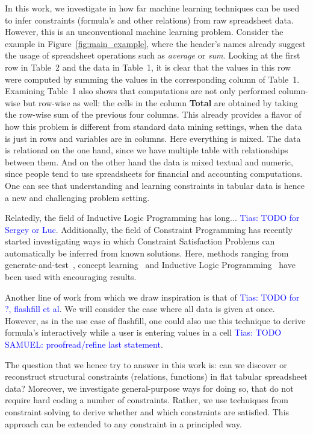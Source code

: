 \documentclass{ecai}
\newcommand{\tias}[1]{\textcolor{blue}{{\sc Tias:} #1}\xspace}
\begin{document}
In this work, we investigate in how far machine learning techniques can be used to infer constraints (formula's and other relations) from raw spreadsheet data. However, this is an unconventional machine learning problem. 
Consider the example in Figure~\ref{fig:main_example}, where the header's names already suggest the usage of spreadsheet operations such as \textit{average} or \textit{sum}.
Looking at the first row in Table~2 and the data in Table~1, it is clear that the values in this row were computed by summing the values in the corresponding column of Table~1.
Examining Table~1 also shows that computations are not only performed column-wise but row-wise as well: the cells in the column \textbf{Total} are obtained by taking the row-wise sum of the previous four columns.
This already provides a flavor of how this problem is different from standard data mining settings, when the data is just in rows and variables are in columns. Here everything is mixed. The data is relational on the one hand, since we have multiple table with relationships between them. And on the other hand the data is mixed textual and numeric, since people tend to use spreadsheets for financial and accounting computations. One can see that understanding and learning constraints in tabular data is hence a new and challenging problem setting.

Relatedly, the field of Inductive Logic Programming has long... \tias{TODO for Sergey or Luc}. Additionally, the field of Constraint Programming has recently started investigating ways in which Constraint Satisfaction Problems can automatically be inferred from known solutions. Here, methods ranging from generate-and-test~\cite{todo:modelseeker}, concept learning~\cite{todo:conacq} and Inductive Logic Programming~\cite{todo:lallouet} have been used with encouraging results.

Another line of work from which we draw inspiration is that of \tias{TODO for ?, flashfill et al}. We will consider the case where all data is given at once. However, as in the use case of flashfill, one could also use this technique to derive formula's interactively while a user is entering values in a cell \tias{TODO SAMUEL: proofread/refine last statement}.

The question that we hence try to answer in this work is: can we discover or reconstruct structural constraints (relations, functions) in flat tabular spreadsheet data? Moreover, we investigate general-purpose ways for doing so, that do not require hard coding a number of constraints. Rather, we use techniques from constraint solving to derive whether and which constraints are satisfied. This approach can be extended to any constraint in a principled way.
\end{document}
